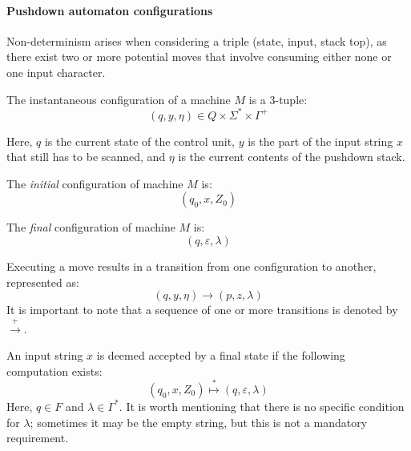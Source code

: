 \paragraph*{Pushdown automaton configurations}
Non-determinism arises when considering a triple (state, input, stack top), as there exist two or more potential moves that involve consuming either none or one input character.
\begin{definition}
    The instantaneous configuration of a machine $M$ is a 3-tuple: 
    \[(q,y,\eta)\in Q \times \Sigma^{\ast} \times \Gamma^{+}\]
\end{definition}
Here, $q$ is the current state of the control unit, $y$ is the part of the input string $x$ that still has to be scanned, and $\eta$ is the current contents of the pushdown stack.
\begin{definition}
    The \emph{initial} configuration of machine $M$ is: 
    \[(q_0,x,Z_0)\]
\end{definition}
\begin{definition}
    The \emph{final} configuration of machine $M$ is: 
    \[(q,\varepsilon,\lambda)\]
\end{definition}

Executing a move results in a transition from one configuration to another, represented as:
\[(q,y,\eta)\rightarrow(p,z,\lambda)\]
It is important to note that a sequence of one or more transitions is denoted by $\overset{+}{\rightarrow}$. 

An input string $x$ is deemed accepted by a final state if the following computation exists:
\[(q_0,x,Z_0)\overset{\ast}{\mapsto}(q,\varepsilon,\lambda)\]
Here, $q \in F$ and $\lambda\in\Gamma^{\ast}$. 
It is worth mentioning that there is no specific condition for $\lambda$; sometimes it may be the empty string, but this is not a mandatory requirement.

